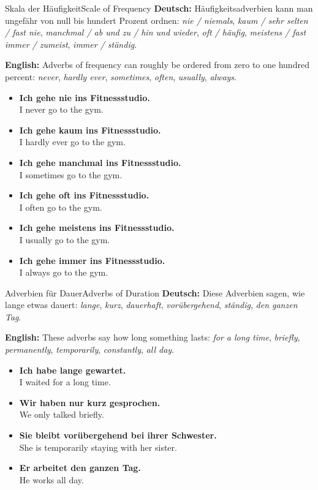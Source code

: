 \documentclass[a4paper,11pt]{article}
\newcommand{\GermanText}[1]{\textbf{Deutsch: }#1\par}
\newcommand{\EnglishText}[1]{{\color{SoftGray}\textbf{English: }#1\par}}
\newcommand{\ExampleItem}[2]{\item \textbf{#1}\\{\color{SoftGray}#2}}
\begin{document}
\begin{grammarentry}{Skala der Häufigkeit}{Scale of Frequency}
    \GermanText{Häufigkeitsadverbien kann man ungefähr von null bis hundert Prozent ordnen: \textit{nie / niemals}, \textit{kaum / sehr selten / fast nie}, \textit{manchmal / ab und zu / hin und wieder}, \textit{oft / häufig}, \textit{meistens / fast immer / zumeist}, \textit{immer / ständig}.}
    \EnglishText{Adverbs of frequency can roughly be ordered from zero to one hundred percent: \textit{never}, \textit{hardly ever}, \textit{sometimes}, \textit{often}, \textit{usually}, \textit{always}.}
    \begin{exbox}
        \begin{itemize}
            \ExampleItem{Ich gehe nie ins Fitnessstudio.}{I never go to the gym.}
            \ExampleItem{Ich gehe kaum ins Fitnessstudio.}{I hardly ever go to the gym.}
            \ExampleItem{Ich gehe manchmal ins Fitnessstudio.}{I sometimes go to the gym.}
            \ExampleItem{Ich gehe oft ins Fitnessstudio.}{I often go to the gym.}
            \ExampleItem{Ich gehe meistens ins Fitnessstudio.}{I usually go to the gym.}
            \ExampleItem{Ich gehe immer ins Fitnessstudio.}{I always go to the gym.}
        \end{itemize}
    \end{exbox}
\end{grammarentry}

\begin{grammarentry}{Adverbien für Dauer}{Adverbs of Duration}
    \GermanText{Diese Adverbien sagen, wie lange etwas dauert: \textit{lange}, \textit{kurz}, \textit{dauerhaft}, \textit{vorübergehend}, \textit{ständig}, \textit{den ganzen Tag}.}
    \EnglishText{These adverbs say how long something lasts: \textit{for a long time}, \textit{briefly}, \textit{permanently}, \textit{temporarily}, \textit{constantly}, \textit{all day}.}
    \begin{exbox}
        \begin{itemize}
            \ExampleItem{Ich habe lange gewartet.}{I waited for a long time.}
            \ExampleItem{Wir haben nur kurz gesprochen.}{We only talked briefly.}
            \ExampleItem{Sie bleibt vorübergehend bei ihrer Schwester.}{She is temporarily staying with her sister.}
            \ExampleItem{Er arbeitet den ganzen Tag.}{He works all day.}
        \end{itemize}
    \end{exbox}
\end{grammarentry}
\end{document}
